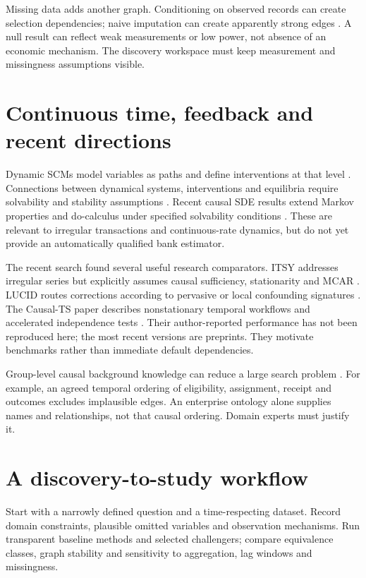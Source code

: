 Missing data adds another graph. Conditioning on observed records can create
selection dependencies; naive imputation can create apparently strong edges
\citep{tu2019}. A null result can reflect weak measurements or low power,
not absence of an economic mechanism. The discovery workspace must keep
measurement and missingness assumptions visible.

\section{Continuous time, feedback and recent directions}
Dynamic SCMs model variables as paths and define interventions at that level
\citep{boeken2024}. Connections between dynamical systems, interventions and
equilibria require solvability and stability assumptions
\citep{bongers2022}. Recent causal SDE results extend Markov properties and
do-calculus under specified solvability conditions \citep{sde2026}.
These are relevant to irregular transactions and continuous-rate dynamics,
but do not yet provide an automatically qualified bank estimator.

The recent search found several useful research comparators.
ITSY addresses irregular series but explicitly assumes causal sufficiency,
stationarity and MCAR \citep{itsy2026}. LUCID routes corrections according
to pervasive or local confounding signatures \citep{lucid2026}.
The Causal-TS paper describes nonstationary temporal workflows and accelerated
independence tests \citep{causalts2026}. Their author-reported performance
has not been reproduced here; the most recent versions are preprints.
They motivate benchmarks rather than immediate default dependencies.

Group-level causal background knowledge can reduce a large search problem
\citep{vargas2026}. For example, an agreed temporal ordering of eligibility,
assignment, receipt and outcomes excludes implausible edges. An enterprise
ontology alone supplies names and relationships, not that causal ordering.
Domain experts must justify it.

\section{A discovery-to-study workflow}
Start with a narrowly defined question and a time-respecting dataset.
Record domain constraints, plausible omitted variables and observation
mechanisms. Run transparent baseline methods and selected challengers;
compare equivalence classes, graph stability and sensitivity to aggregation,
lag windows and missingness.

